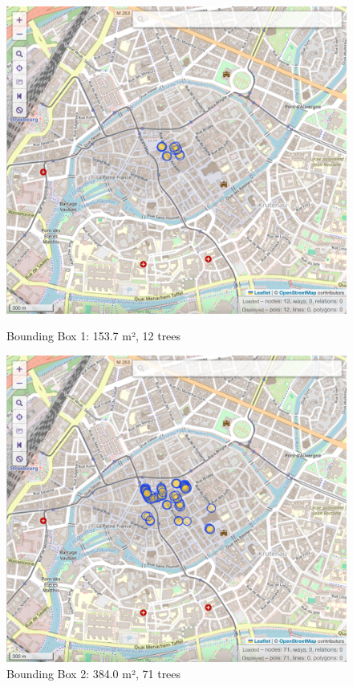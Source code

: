 \documentclass[12pt]{article}
\begin{document}
\begin{figure}[H]
    \centering
    \begin{minipage}{0.45\textwidth}
        \centering
        \includegraphics[width=\textwidth]{images/bbox1.png}
        \caption{Bounding Box 1: 153.7 m², 12 trees}
    \end{minipage}\hfill
    \begin{minipage}{0.45\textwidth}
        \centering
        \includegraphics[width=\textwidth]{images/bbox2.png}
        \caption{Bounding Box 2: 384.0 m², 71 trees}
    \end{minipage}
\end{figure}
\end{document}
